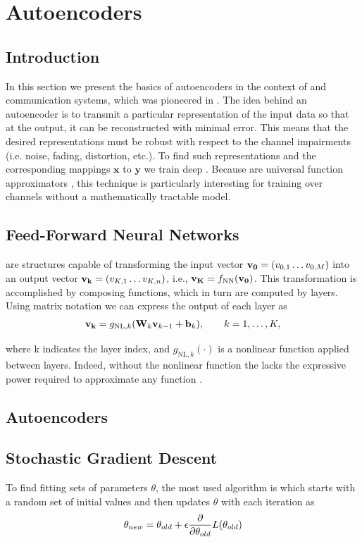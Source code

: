 	
\section{Autoencoders}
\subsection{Introduction}
In this section we present the basics of autoencoders in the context of  and communication systems, which was pioneered in \cite{O'Shea}. The idea behind an autoencoder is to transmit a particular representation of the input data so that at the output, it can be reconstructed with minimal error. This means that the desired representations must be robust with respect to the channel impairments (i.e. noise, fading, distortion, etc.). To find such representations and the corresponding mappings $\textbf{x}$ to $\textbf{y}$ we train deep . Because  are universal function approximators \cite{HORNIK1989359}, this technique is particularly interesting for training over channels without a mathematically tractable model.

\subsection{Feed-Forward Neural Networks}
 are structures capable of transforming the input vector $\bold{v_0} = (v_{0,1} \dots v_{0,M})$ into an output vector $\bold{v_k} = (v_{K,1} \dots v_{K,n})$, i.e., $\bold{v_K}=f_{\text{NN}}(\bold{v_0})$. This transformation is accomplished by composing functions, which in turn are computed by layers. Using matrix notation we can express the output of each layer as
\begin{align}
	\vb{v_k} = g_{\text{NL},k}(\vb{W}_k\vb{v}_{k-1}+\vb{b}_k), \qquad k = 1, \dots, K,
\end{align}

where k indicates the layer index, and $g_{\text{NL},k}(\cdot)$ is a nonlinear function applied between layers. Indeed, without the nonlinear function the  lacks the expressive power required to approximate any function \cite{HORNIK1989359}.



\subsection{Autoencoders}

\subsection{Stochastic Gradient Descent}
To find fitting sets of parameters \textbf{$\theta$}, the most used algorithm is  which starts with a random set of initial values and then updates \textbf{$\theta$} with each iteration as
\begin{align}
	\theta_{new} = \theta_{old} + \epsilon \pdv{\theta_{old}} L(\theta_{old})
\end{align}

